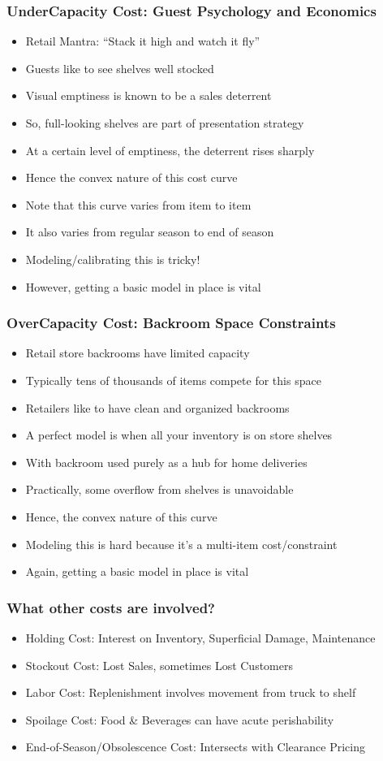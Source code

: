 \documentclass[handout]{beamer}
\begin{document}
\begin{frame}
\frametitle{UnderCapacity Cost: Guest Psychology and Economics}
\pause
\begin{itemize}[<+->]
\item Retail Mantra: ``Stack it high and watch it fly''
\item Guests like to see shelves well stocked
\item Visual emptiness is known to be a sales deterrent
\item So, full-looking shelves are part of presentation strategy
\item At a certain level of emptiness, the deterrent rises sharply
\item Hence the convex nature of this cost curve
\item Note that this curve varies from item to item
\item It also varies from regular season to end of season
\item Modeling/calibrating this is tricky!
\item However, getting a basic model in place is vital
\end{itemize}
\end{frame}

\begin{frame}
\frametitle{OverCapacity Cost: Backroom Space Constraints}
\pause
\begin{itemize}[<+->]
\item Retail store backrooms have limited capacity
\item Typically tens of thousands of items compete for this space
\item Retailers like to have clean and organized backrooms
\item A perfect model is when all your inventory is on store shelves
\item With backroom used purely as a hub for home deliveries
\item Practically, some overflow from shelves is unavoidable
\item Hence, the convex nature of this curve
\item Modeling this is hard because it's a multi-item cost/constraint
\item Again, getting a basic model in place is vital
\end{itemize}
\end{frame}

\begin{frame}
\frametitle{What other costs are involved?}
\pause
\begin{itemize}[<+->]
\item Holding Cost: Interest on Inventory, Superficial Damage, Maintenance
\item Stockout Cost: Lost Sales, sometimes Lost Customers
\item Labor Cost: Replenishment involves movement from truck to shelf
\item Spoilage Cost: Food \& Beverages can have acute perishability
\item End-of-Season/Obsolescence Cost: Intersects with Clearance Pricing 
\end{itemize}
\end{frame}
\end{document}
